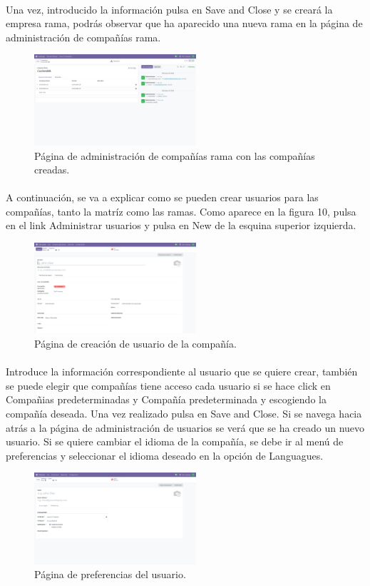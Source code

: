 \documentclass[paper=a4wide, fontsize=11pt]{report}	 %
\begin{document}
\paragraph{}
Una vez, introducido la información pulsa en Save and Close y se creará la empresa rama, podrás observar que ha aparecido una nueva rama en la página de administración de compañías rama.
\begin{figure}[h]
    \centering
    \includegraphics[width=6cm]{ramasCreadas.png}
    \caption{Página de administración de compañías rama con las compañías creadas.}
    \label{fig:faqs}
\end{figure}
\paragraph{}
A continuación, se va a explicar como se pueden crear usuarios para las compañías, tanto la matríz como las ramas. Como aparece en la figura 10, pulsa en el link Administrar usuarios y pulsa en New de la esquina superior izquierda. 
\begin{figure}[h]
    \centering
    \includegraphics[width=6cm]{adminUsuarios.png}
    \caption{Página de creación de usuario de la compañía.}
    \label{fig:faqs}
\end{figure}
\paragraph{}
Introduce la información correspondiente al usuario que se quiere crear, también se puede elegir que compañías tiene acceso cada usuario si se hace click en Compañias predeterminadas y Compañía predeterminada y escogiendo la compañía deseada. Una vez realizado pulsa en Save and Close. Si se navega hacia atrás a la página de administración de usuarios se verá que se ha creado un nuevo usuario.
Si se quiere cambiar el idioma de la compañía, se debe ir al menú de preferencias y seleccionar el idioma deseado en la opción de Languagues.
\begin{figure}[h]
    \centering
    \includegraphics[width=6cm]{languageUsuario.png}
    \caption{Página de preferencias del usuario.}
    \label{fig:faqs}
\end{figure}
\end{document}
